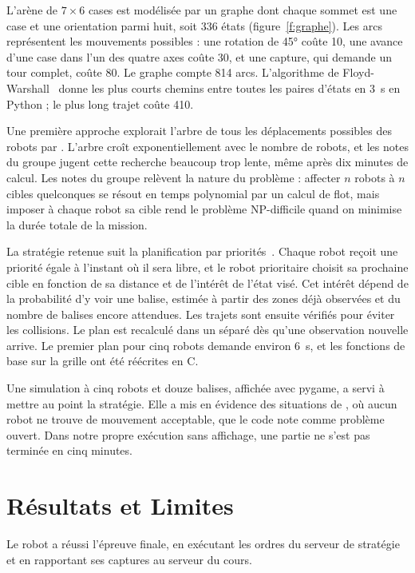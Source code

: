  L'arène de $7 \times 6$ cases est modélisée
par un graphe dont chaque sommet est une case et une
orientation parmi huit, soit 336 états (figure~\ref{f:graphe}). Les arcs
représentent les mouvements possibles : une rotation de
45° coûte 10, une avance d'une case dans l'un des quatre
axes coûte 30, et une capture, qui demande un tour complet, coûte 80. Le graphe compte 814 arcs. L'algorithme
de Floyd-Warshall~\cite{floyd} donne les plus courts chemins entre
toutes les paires d'états en 3~s en Python ; le plus long trajet coûte 410.

 Une première approche explorait l'arbre de tous les déplacements possibles des robots
par . L'arbre croît exponentiellement avec le nombre de robots, et les notes du groupe
jugent cette recherche beaucoup trop lente, même après
dix minutes de calcul. Les notes du groupe relèvent la
nature du problème : affecter $n$ robots à $n$ cibles quelconques se résout en temps polynomial par un calcul
de flot, mais imposer à chaque robot sa cible rend le
problème NP-difficile quand on minimise la durée totale de la mission.

 La stratégie retenue suit la planification par priorités~\cite{erdmann,silver}. Chaque robot reçoit une
priorité égale à l'instant où il sera libre, et le robot prioritaire choisit sa prochaine cible en fonction de sa distance
et de l'intérêt de l'état visé. Cet intérêt dépend de la
probabilité d'y voir une balise, estimée à partir des zones
déjà observées et du nombre de balises encore attendues.
Les trajets sont ensuite vérifiés pour éviter les collisions.
Le plan est recalculé dans un  séparé dès
qu'une observation nouvelle arrive. Le premier plan pour
cinq robots demande environ 6~s, et les fonctions de base
sur la grille ont été réécrites en C.

Une simulation à cinq robots et douze balises, affichée
avec pygame, a servi à mettre au point la stratégie. Elle
a mis en évidence des situations de , où aucun
robot ne trouve de mouvement acceptable, que le code
note comme problème ouvert. Dans notre propre exécution sans affichage, une partie ne s'est pas terminée en cinq minutes.

\section{Résultats et Limites}
Le robot a réussi l'épreuve finale, en exécutant les
ordres du serveur de stratégie et en rapportant ses captures au serveur du cours.

